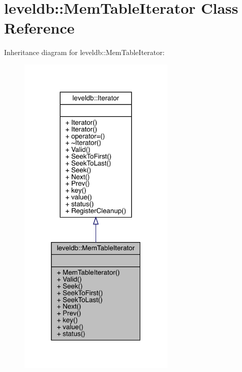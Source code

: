 \hypertarget{classleveldb_1_1_mem_table_iterator}{}\section{leveldb\+::Mem\+Table\+Iterator Class Reference}
\label{classleveldb_1_1_mem_table_iterator}


Inheritance diagram for leveldb\+::Mem\+Table\+Iterator\+:
\nopagebreak
\begin{figure}[H]
\begin{center}
\leavevmode
\includegraphics[width=211pt]{classleveldb_1_1_mem_table_iterator__inherit__graph}
\end{center}
\end{figure}


